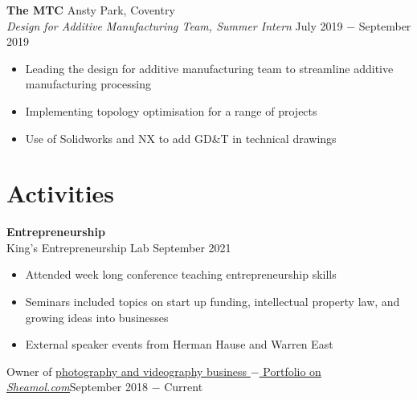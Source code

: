 \documentclass{article}
\begin{document}

\textbf{The MTC} \hfill Ansty Park, Coventry \\
\textit{Design for Additive Manufacturing Team, Summer Intern} \hfill July 2019 $-$ September 2019
\begin{itemize}
\item {Leading the design for additive manufacturing team to streamline additive manufacturing processing}
\item{Implementing topology optimisation for a range of projects}
\item{Use of Solidworks and NX to add GD\&T in technical drawings}
\end{itemize} \medskip


\vspace{-.5\baselineskip}
\hrulefill
\vspace{-.5\baselineskip}

\clearpage
\section*{Activities}

\textbf{Entrepreneurship}\\
King's Entrepreneurship Lab \hfill September 2021
\begin{itemize}
    \item Attended week long conference teaching entrepreneurship skills
    \item Seminars included topics on start up funding, intellectual property law, and growing ideas into businesses
    \item External speaker events from Herman Hause and Warren East 
\end{itemize}
Owner of \href{www.sheamol.com}{photography and videography business $-$ Portfolio on \underline{\textit{Sheamol.com}}}\hfill September 2018 $-$ Current \medskip
\end{document}

